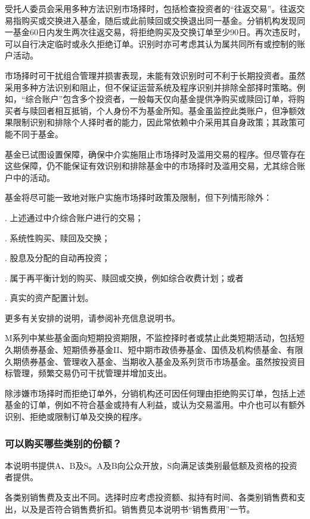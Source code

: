 \documentclass[UTF8,fontset=none,11pt,a4paper]{ctexart}
\begin{document}
\par{}\label{originalpage9}
受托人委员会采用多种方法识别市场择时，包括检查投资者的“往返交易”。往返交易指购买或交换进入基金，随后或此前赎回或交换退出同一基金。分销机构发现同一基金60日内发生两次往返交易，将拒绝购买及交换订单至少90日。再次违反时，可以自行决定临时或永久拒绝订单。识别时亦可考虑其认为属共同所有或控制的账户活动。

市场择时可干扰组合管理并损害表现，未能有效识别时可不利于长期投资者。虽然采用多种方法识别和阻止，但不保证运营系统及程序识别并排除全部择时策略。例如，“综合账户”包含多个投资者，一般每天仅向基金提供净购买或赎回订单，将购买者与赎回者相互抵销，个人身份不为基金所知。基金虽监控此类账户，但净额效果限制识别和排除个人择时者的能力，因此常依赖中介采用其自身政策；其政策可能不同于基金。

基金已试图设置保障，确保中介实施阻止市场择时及滥用交易的程序。但尽管存在这些保障，仍不能保证有效识别和排除基金中的市场择时及滥用交易，尤其综合账户中的活动。

基金将尽可能一致地对账户实施市场择时政策及限制，但下列情形除外：

. 上述通过中介综合账户进行的交易；


. 系统性购买、赎回及交换；


. 股息及分配的自动再投资；


. 属于再平衡计划的购买、赎回或交换，例如综合收费计划；或者


. 真实的资产配置计划。


更多有关安排的说明，请参阅补充信息说明书。

M系列中某些基金面向短期投资期限，不监控择时者或禁止此类短期活动，包括短久期债券基金、短期债券基金II、短中期市政债券基金、国债及机构债基金、有限久期债券基金、管理收入基金、当期收入基金及系列货币市场基金。虽然按投资目标管理，频繁交易仍可干扰管理并增加支出。

除涉嫌市场择时而拒绝订单外，分销机构还可因任何理由拒绝购买订单，包括上述基金的订单，例如不符合基金或持有人利益，或认为交易滥用。中介也可以有额外识别、拒绝或限制订单及交换的程序。

\subsubsection*{可以购买哪些类别的份额？}
本说明书提供A、B及S。A及B向公众开放，S向满足该类别最低额及资格的投资者提供。

各类别销售费及支出不同。选择时应考虑投资额、拟持有时间、各类别销售费和支出，以及是否符合销售费折扣。销售费见本说明书“销售费用”一节。
\end{document}

